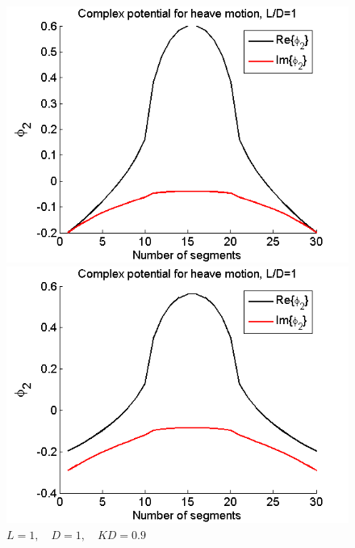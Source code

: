 \documentclass[a4paper,10pt]{article}
\begin{document}
\begin{figure}[H]
  \includegraphics[width=\linewidth]{phi2_box2_12.png}
  \caption{$L = 1 , \quad D = 1 , \quad K D = 1.2$}\label{box2_1.2}
\endminipage\hfill
{}
  \includegraphics[width=\linewidth]{phi2_box2_09.png}
  \caption{$L = 1 , \quad D = 1, \quad K D = 0.9$}\label{box2_0.9}
\endminipage
\end{figure}
\end{document}
